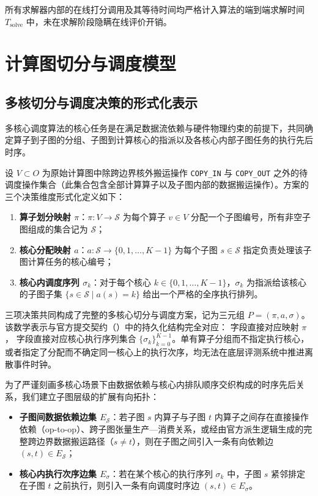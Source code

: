 \documentclass[anonymous,withtoc]{gmcm2026}
\providecommand{\tightlist}{\setlength{\itemsep}{0pt}\setlength{\parskip}{0pt}}
\begin{document}
所有求解器内部的在线打分调用及其等待时间均严格计入算法的端到端求解时间 \(T_{\text{solve}}\) 中，未在求解阶段隐瞒在线评价开销。


\section{计算图切分与调度模型}

\subsection{多核切分与调度决策的形式化表示}

多核心调度算法的核心任务是在满足数据流依赖与硬件物理约束的前提下，共同确定算子到子图的分组、子图到计算核心的指派以及各核心内部子图任务的执行先后时序。

设 \(V \subset O\) 为原始计算图中除跨边界核外搬运操作 \texttt{COPY\_IN} 与 \texttt{COPY\_OUT} 之外的待调度操作集合（此集合包含全部计算算子以及子图内部的数据搬运操作）。方案的三个决策维度形式化定义如下：

\begin{enumerate}
\def\labelenumi{\arabic{enumi}.}
\tightlist
\item
  \textbf{算子划分映射 \(\pi\)}：\(\pi: V \to \mathcal{S}\) 为每个算子 \(v \in V\) 分配一个子图编号，所有非空子图组成的集合记为 \(\mathcal{S}\)；
\item
  \textbf{核心分配映射 \(a\)}：\(a: \mathcal{S} \to \{0, 1, \dots, K-1\}\) 为每个子图 \(s \in \mathcal{S}\) 指定负责处理该子图计算任务的核心编号；
\item
  \textbf{核心内调度序列 \(\sigma_k\)}：对于每个核心 \(k \in \{0, 1, \dots, K-1\}\)，\(\sigma_k\) 为指派给该核心的子图子集 \(\{s \in \mathcal{S} \mid a(s) = k\}\) 给出一个严格的全序执行排列。
\end{enumerate}

三项决策共同构成了完整的多核心切分与调度方案，记为三元组 \(P = (\pi, a, \sigma)\)。该数学表示与官方提交契约（\texttt{}）中的持久化结构完全对应：\texttt{} 字段直接对应映射 \(\pi\)，\texttt{} 字段直接对应核心执行序列集合 \(\{\sigma_k\}_{k=0}^{K-1}\)。单有算子分组而不指定执行核心，或者指定了分配而不确定同一核心上的执行次序，均无法在底层评测系统中推进离散事件时钟。

为了严谨刻画多核心场景下由数据依赖与核心内排队顺序交织构成的时序先后关系，我们建立子图层级的扩展有向拓扑：

\begin{itemize}
\tightlist
\item
  \textbf{子图间数据依赖边集 \(E_{\mathcal{S}}\)}：若子图 \(s\) 内算子与子图 \(t\) 内算子之间存在直接操作依赖（op-to-op）、跨子图张量生产---消费关系，或经由官方派生逻辑生成的完整跨边界数据搬运路径（\(s \ne t\)），则在子图之间引入一条有向依赖边 \((s, t) \in E_{\mathcal{S}}\)；
\item
  \textbf{核心内执行次序边集 \(E_\sigma\)}：若在某个核心的执行序列 \(\sigma_k\) 中，子图 \(s\) 紧邻排定在子图 \(t\) 之前执行，则引入一条有向调度时序边 \((s, t) \in E_\sigma\)。
\end{itemize}
\end{document}
